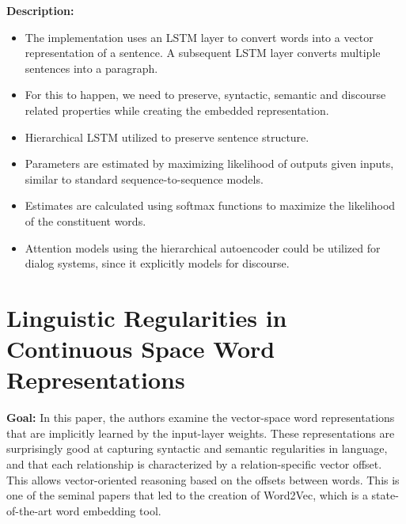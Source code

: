 \documentclass[11pt,a4paper]{article}
\begin{document}
  \textbf{Description:}
  \begin{itemize}
    \item
    The implementation uses an LSTM layer to convert words into a vector representation of a sentence. A subsequent LSTM layer converts multiple sentences into a paragraph.
    \item
    For this to happen, we need to preserve, syntactic, semantic and discourse related properties while creating the embedded representation.
    \item
    Hierarchical LSTM utilized to preserve sentence structure.
    \item
    Parameters are estimated by maximizing likelihood of outputs given inputs, similar to standard sequence-to-sequence models.
    \item
    Estimates are calculated using softmax functions to maximize the likelihood of the constituent words.
    \item
    Attention models using the hierarchical autoencoder could be utilized for dialog systems, since it explicitly models for discourse.
  \end{itemize}



\section{Linguistic Regularities in Continuous Space Word Representations} %
\label{sec:linguistic_regularities_in_continuous_space_word_representations}


  \textbf{Goal:}
  In this paper, the authors examine the vector-space word representations that are implicitly learned by the input-layer weights. These representations are surprisingly good at capturing syntactic and semantic regularities in language, and that each relationship is characterized by a relation-specific vector offset. This allows vector-oriented reasoning based on the offsets between words\cite{mikolov2013linguistic}. This is one of the seminal papers that led to the creation of Word2Vec, which is a state-of-the-art word embedding tool\cite{mikolov2013efficient}.\\
\end{document}
